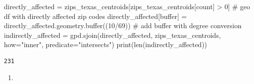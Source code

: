 \documentclass[
  letterpaper,
  DIV=11,
  numbers=noendperiod]{scrartcl}
\newenvironment{Shaded}{\begin{snugshade}}{\end{snugshade}}
\newcommand{\BuiltInTok}[1]{\textcolor[rgb]{0.00,0.23,0.31}{#1}}
\newcommand{\CommentTok}[1]{\textcolor[rgb]{0.37,0.37,0.37}{#1}}
\newcommand{\DecValTok}[1]{\textcolor[rgb]{0.68,0.00,0.00}{#1}}
\newcommand{\NormalTok}[1]{\textcolor[rgb]{0.00,0.23,0.31}{#1}}
\newcommand{\OperatorTok}[1]{\textcolor[rgb]{0.37,0.37,0.37}{#1}}
\newcommand{\StringTok}[1]{\textcolor[rgb]{0.13,0.47,0.30}{#1}}
\providecommand{\tightlist}{%
  \setlength{\itemsep}{0pt}\setlength{\parskip}{0pt}}\usepackage{longtable,booktabs,array}
\begin{document}
\begin{Shaded}
\begin{Highlighting}[]
\NormalTok{directly\_affected }\OperatorTok{=}\NormalTok{ zips\_texas\_centroids[zips\_texas\_centroids[}\StringTok{\textquotesingle{}count\textquotesingle{}}\NormalTok{] }\OperatorTok{\textgreater{}} \DecValTok{0}\NormalTok{] }\CommentTok{\# geo df with directly affected zip codes}
\NormalTok{directly\_affected[}\StringTok{\textquotesingle{}buffer\textquotesingle{}}\NormalTok{] }\OperatorTok{=}\NormalTok{ directly\_affected.geometry.}\BuiltInTok{buffer}\NormalTok{((}\DecValTok{10}\OperatorTok{/}\DecValTok{69}\NormalTok{)) }\CommentTok{\# add buffer with degree conversion}
\NormalTok{indirectly\_affected }\OperatorTok{=}\NormalTok{ gpd.sjoin(directly\_affected, zips\_texas\_centroids, how}\OperatorTok{=}\StringTok{"inner"}\NormalTok{, predicate}\OperatorTok{=}\StringTok{"intersects"}\NormalTok{)}
\BuiltInTok{print}\NormalTok{(}\BuiltInTok{len}\NormalTok{(indirectly\_affected))}
\end{Highlighting}
\end{Shaded}

\begin{verbatim}
231
\end{verbatim}

\begin{enumerate}
\def\labelenumi{\arabic{enumi}.}
\setcounter{enumi}{3}
\tightlist
\item
\end{enumerate}
\end{document}
